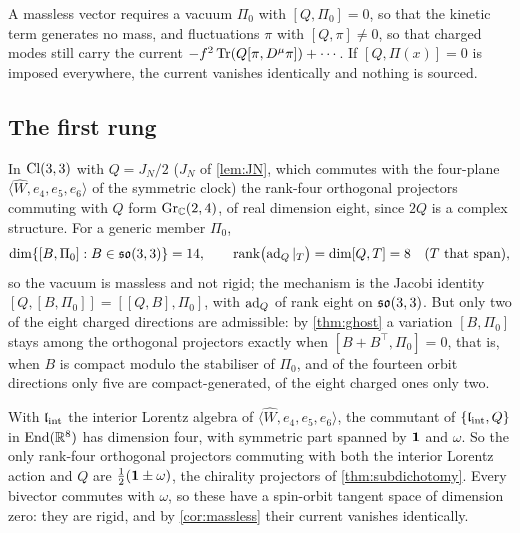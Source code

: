 \begin{corollary}
\label{cor:massless}
A massless vector requires a vacuum $\Pi_0$ with $[Q,\Pi_0]=0$, so that the kinetic term generates no mass, and fluctuations $\pi$ with $[Q,\pi]\neq0$, so that charged modes
still carry the current $-f^2\operatorname{Tr}(Q[\pi,D^\mu\pi])+\cdots$. If $[Q,\Pi(x)]=0$ is imposed everywhere, the current vanishes identically and nothing is sourced.
\end{corollary}

\subsection{The first rung}

\begin{theorem}
\label{thm:massless1}
In $\mathrm{Cl}(3,3)$ with $Q=J_N/2$ ($J_N$ of \cref{lem:JN}, which commutes with the four-plane $\langle\widehat W,e_4,e_5,e_6\rangle$ of the symmetric clock) the rank-four orthogonal projectors commuting with $Q$ form $\mathrm{Gr}_{\mathbb{C}}(2,4)$, of real dimension eight, since $2Q$ is a complex structure.
For a generic member $\Pi_0$,
\[
\dim\{[B,\Pi_0]:B\in\mathfrak{so}(3,3)\}=14,\qquad \operatorname{rank}\bigl(\operatorname{ad}_Q|_{T}\bigr)=\dim[Q,T]=8\quad(T\ \text{that span}),
\]
so the vacuum is massless and not rigid; the mechanism is the Jacobi identity $[Q,[B,\Pi_0]]=[[Q,B],\Pi_0]$, with $\operatorname{ad}_Q$ of rank eight on $\mathfrak{so}(3,3)$. But only two of the eight
charged directions are admissible: by \cref{thm:ghost} a variation $[B,\Pi_0]$ stays among the orthogonal projectors exactly when $[B+B^{\!\top},\Pi_0]=0$, that is,
when $B$ is compact modulo the stabiliser of $\Pi_0$, and of the fourteen orbit directions only five are compact-generated, of the eight charged ones only two.
\end{theorem}

\begin{proposition}
\label{prop:rigid}
With $\mathfrak l_{\rm int}$ the interior Lorentz algebra of $\langle\widehat W,e_4,e_5,e_6\rangle$, the commutant of $\{\mathfrak l_{\rm int},Q\}$ in $\operatorname{End}(\mathbb{R}^8)$ has dimension four, with symmetric part spanned by $\mathbf 1$ and $\omega$. So the only rank-four orthogonal projectors commuting
with both the interior Lorentz action and $Q$ are $\tfrac12(\mathbf 1\pm\omega)$, the chirality projectors of \cref{thm:subdichotomy}. Every bivector commutes with $\omega$, so
these have a spin-orbit tangent space of dimension zero: they are rigid, and by \cref{cor:massless} their current vanishes identically.
\end{proposition}

